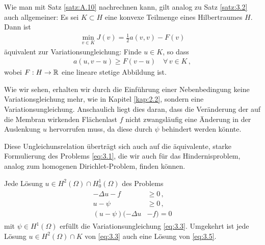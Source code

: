 \begin{bem}\label{bem:3.3}
Wie man mit Satz \ref{satz:A.10} nachrechnen kann, gilt analog zu Satz \ref{satz:3.2} auch allgemeiner: Es sei $K\subset H$ eine konvexe Teilmenge eines Hilbertraumes $H$. Dann ist
\begin{align*}
	\min_{v\in K} J(v) = \frac 1 2 a(v,v)-F(v)
\end{align*}
äquivalent zur Variationsungleichung: Finde $u \in K$, so dass
\begin{align*}
	a(u,v-u) \ge F(v-u) \quad \forall \, v \in K \, ,
\end{align*}
wobei $F :H\rightarrow \mathbb{R}$ eine lineare stetige Abbildung ist.
\end{bem}


Wie wir sehen, erhalten wir durch die Einführung einer Nebenbedingung keine Variationsgleichung mehr, wie in Kapitel \ref{kap:2.2}, sondern eine Variationsungleichung. Anschaulich liegt dies daran, dass die Veränderung der auf die Membran wirkenden Flächenlast $f$ nicht zwangsläufig eine Änderung in der Auslenkung $u$ hervorrufen muss, da diese durch $\psi$ behindert werden könnte. 

Diese Ungleichunsrelation überträgt sich auch auf die äquivalente, starke Formulierung des Problems \eqref{eq:3.1}, die wir auch für das Hindernisproblem, analog zum homogenen Dirichlet-Problem, finden können.


\begin{satz}\label{satz:3.4} Jede Lösung $u \in H^2(\Omega) \cap H^1_0(\Omega)$ des Problems
\begin{align}\label{eq:3.5}
\begin{aligned}
	-\Delta u -f&\ge 0\, , \\
	u-\psi &\ge 0\, ,  \\
	(u-\psi) (-\Delta u &- f) = 0
\end{aligned}
\end{align}
mit $\psi \in H^1(\Omega)$ erfüllt die Variationsungleichung \eqref{eq:3.3}. Umgekehrt ist jede Lösung $u\in H^2(\Omega) \cap K$ von \eqref{eq:3.3} auch eine Lösung von \eqref{eq:3.5}.
\end{satz}

